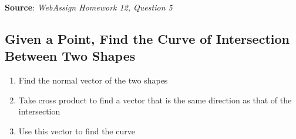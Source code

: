     \textbf{Source}: \textit{WebAssign Homework 12, Question 5}

  \subsection{Given a Point, Find the Curve of Intersection Between Two Shapes}

    \begin{enumerate}
      \item Find the normal vector of the two shapes
      \item Take cross product to find a vector that is the same direction
      as that of the intersection
      \item Use this vector to find the curve
    \end{enumerate}